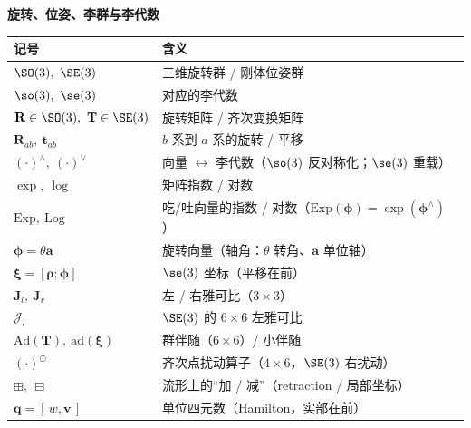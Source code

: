 \begin{center}\small
\textbf{旋转、位姿、李群与李代数}\par\vspace{3pt}
\begin{tabular}{ll}
\toprule
记号 & 含义 \\
\midrule
$\SO(3),\ \SE(3)$ & 三维旋转群 / 刚体位姿群 \\
$\so(3),\ \se(3)$ & 对应的李代数 \\
$\mathbf{R}\in\SO(3),\ \mathbf{T}\in\SE(3)$ & 旋转矩阵 / 齐次变换矩阵 \\
$\mathbf{R}_{ab},\ \mathbf{t}_{ab}$ & $b$ 系到 $a$ 系的旋转 / 平移 \\
$(\cdot)^\wedge,\ (\cdot)^\vee$ & 向量 $\leftrightarrow$ 李代数（$\so(3)$ 反对称化；$\se(3)$ 重载） \\
$\exp,\ \log$ & 矩阵指数 / 对数 \\
$\mathrm{Exp},\ \mathrm{Log}$ & 吃/吐向量的指数 / 对数（$\mathrm{Exp}(\boldsymbol{\phi})=\exp(\boldsymbol{\phi}^\wedge)$） \\
$\boldsymbol{\phi}=\theta\mathbf{a}$ & 旋转向量（轴角：$\theta$ 转角、$\mathbf{a}$ 单位轴） \\
$\boldsymbol{\xi}=[\boldsymbol{\rho};\boldsymbol{\phi}]$ & $\se(3)$ 坐标（平移在前） \\
$\mathbf{J}_l,\ \mathbf{J}_r$ & 左 / 右雅可比（$3\times3$） \\
$\boldsymbol{\mathcal{J}}_l$ & $\SE(3)$ 的 $6\times6$ 左雅可比 \\
$\mathrm{Ad}(\mathbf{T}),\ \mathrm{ad}(\boldsymbol{\xi})$ & 群伴随（$6\times6$）/ 小伴随 \\
$(\cdot)^\odot$ & 齐次点扰动算子（$4\times6$，$\SE(3)$ 右扰动） \\
$\boxplus,\ \boxminus$ & 流形上的“加 / 减”（retraction / 局部坐标） \\
$\mathbf{q}=[\,w,\mathbf{v}\,]$ & 单位四元数（Hamilton，实部在前） \\
\bottomrule
\end{tabular}
\end{center}

